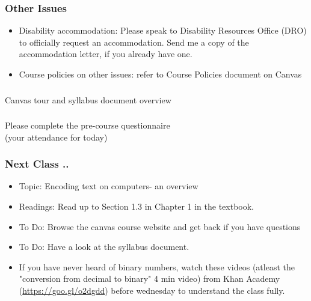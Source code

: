 \documentclass{beamer}
\begin{document}
\begin{frame}
\frametitle{Other Issues}
\begin{itemize}
\item Disability accommodation: Please speak to Disability Resources Office (DRO) to officially request an accommodation. Send me a copy of the accommodation letter, if you already have one.
\item Course policies on other issues: refer to Course Policies document on Canvas
\end{itemize}
\end{frame}

\begin{frame}
\frametitle{}
\begin{center}
\Large Canvas tour and syllabus document overview
\end{center}
\end{frame}

\begin{frame}
\frametitle{}
\begin{center}
\Large Please complete the pre-course questionnaire \\ \small (your attendance for today)
\end{center}
\end{frame}

\begin{frame}
\frametitle{Next Class ..} 
\begin{itemize}
\item Topic: Encoding text on computers- an overview
\item Readings: Read up to Section 1.3 in Chapter 1 in the textbook.
\item To Do: Browse the canvas course website and get back if you have questions
\item To Do: Have a look at the syllabus document.
\item If you have never heard of binary numbers, watch these videos (atleast the "conversion from decimal to binary" 4 min video) from Khan Academy (\url{https://goo.gl/o2dgdd}) before wednesday to understand the class fully.
\end{itemize}
\end{frame}
\end{document}
